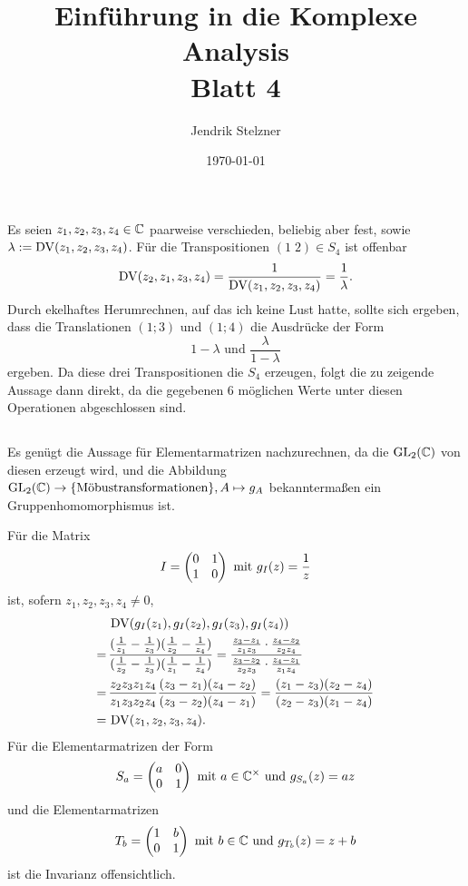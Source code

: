 \documentclass[a4paper,10pt]{article}
\title{\sc Einführung in die Komplexe Analysis \\ \Large Blatt 4}
\author{Jendrik Stelzner}
\date{\today}
\begin{document}
\maketitle






\section{}


\subsection{}
Es seien $z_1, z_2, z_3, z_4 \in \mathbb{C}$ paarweise verschieden, beliebig aber fest, sowie $\lambda := \operatorname{DV}(z_1, z_2, z_3, z_4)$. Für die Transpositionen $(1\;2) \in S_4$ ist offenbar
\[
 \operatorname{DV}(z_2, z_1, z_3, z_4) = \frac{1}{\operatorname{DV}(z_1, z_2, z_3, z_4)} = \frac{1}{\lambda}.
\]
Durch ekelhaftes Herumrechnen, auf das ich keine Lust hatte, sollte sich ergeben, dass die Translationen $(1;3)$ und $(1;4)$ die Ausdrücke der Form
\[
 1-\lambda \text{ und } \frac{\lambda}{1-\lambda}
\]
ergeben. Da diese drei Transpositionen die $S_4$ erzeugen, folgt die zu zeigende Aussage dann direkt, da die gegebenen $6$ möglichen Werte unter diesen Operationen abgeschlossen sind.




\addtocounter{subsection}{1}


\subsection{}
Es genügt die Aussage für Elementarmatrizen nachzurechnen, da die $\operatorname{GL}_2(\mathbb{C})$ von diesen erzeugt wird, und die Abbildung $\operatorname{GL}_2(\mathbb{C}) \to \{\text{Möbustransformationen}\}, A \mapsto g_A$ bekanntermaßen ein Gruppenhomomorphismus ist.

Für die Matrix
\[
 I = \begin{pmatrix}0 & 1 \\ 1 & 0\end{pmatrix} \text{ mit } g_I(z) = \frac{1}{z}
\]
ist, sofern $z_1, z_2, z_3, z_4 \neq 0$,
\begin{align*}
  &\,\operatorname{DV}(g_I(z_1), g_I(z_2), g_I(z_3), g_I(z_4)) \\
 =&\, \frac{(\frac{1}{z_1}-\frac{1}{z_3})(\frac{1}{z_2}-\frac{1}{z_4})}{(\frac{1}{z_2}-\frac{1}{z_3})(\frac{1}{z_1}-\frac{1}{z_4})}
 = \frac{\frac{z_3 - z_1}{z_1 z_3} \cdot \frac{z_4 - z_2}{z_2 z_4}}{\frac{z_3 - z_2}{z_2 z_3} \cdot \frac{z_4 - z_1}{z_1 z_4}} \\
 =&\, \frac{z_2 z_3 z_1 z_4}{z_1 z_3 z_2 z_4} \frac{(z_3 - z_1)(z_4-z_2)}{(z_3-z_2)(z_4-z_1)}
 = \frac{(z_1 - z_3)(z_2 - z_4)}{(z_2 - z_3)(z_1 - z_4)} \\
 =&\, \operatorname{DV}(z_1, z_2, z_3, z_4).
\end{align*}
Für die Elementarmatrizen der Form
\[
 S_a = \begin{pmatrix}a & 0 \\ 0 & 1\end{pmatrix} \text{ mit } a \in \mathbb{C}^\times \text{ und } g_{S_a}(z) = az
\]
und die Elementarmatrizen
\[
 T_b = \begin{pmatrix}1 & b \\ 0 & 1\end{pmatrix} \text{ mit } b \in \mathbb{C} \text{ und } g_{T_b}(z) = z+b
\]
ist die Invarianz offensichtlich.
\end{document}
